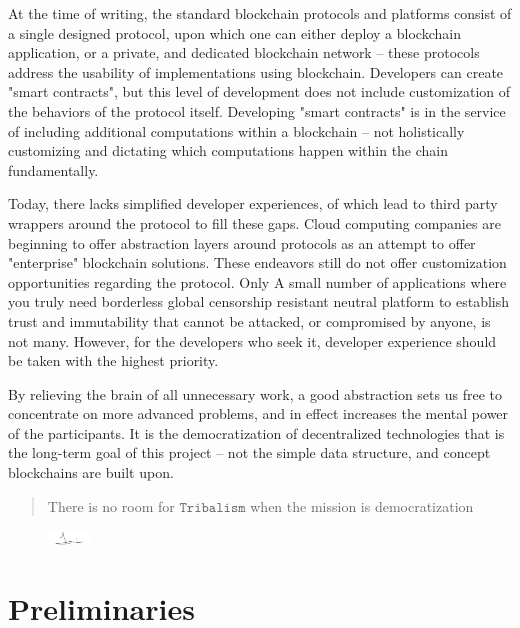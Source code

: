\documentclass[12pt, titlepage, twocolumn]{report}
\begin{document}
At the time of writing, the standard blockchain protocols and platforms consist of a single designed protocol, upon which one can either deploy a blockchain application, or a private, and dedicated blockchain network -- these protocols address the usability of implementations using blockchain. Developers can create "smart contracts", but this level of development does not include customization of the behaviors of the protocol itself. Developing "smart contracts" is in the service of including additional computations within a blockchain -- not holistically customizing and dictating which computations happen within the chain fundamentally. 

Today, there lacks simplified developer experiences, of which lead to third party wrappers around the protocol to fill these gaps. Cloud computing companies are beginning to offer abstraction layers around protocols as an attempt to offer "enterprise" blockchain solutions. These endeavors still do not offer customization opportunities regarding the protocol. Only A small number of applications where you truly need borderless global censorship resistant neutral platform to establish trust and immutability that cannot be attacked, or compromised by anyone, is not many. However, for the developers who seek it, developer experience should be taken with the highest priority.

By relieving the brain of all unnecessary work, a good abstraction sets us free to concentrate on more advanced problems, and in effect increases the mental power of the participants. It is the democratization of decentralized technologies that is the long-term goal of this project -- not the simple data structure, and concept blockchains are built upon.

\begin{quotation}
There is no room for \(\texttt{Tribalism}\) when the mission is democratization
\end{quotation}

\begin{figure}[ht]
	\begin{flushright}
		\includegraphics[width=0.10\textwidth]{signature.png}	
	\end{flushright}
\end{figure}

\clearpage
\onecolumn


\part{Preliminaries}
\end{document}
